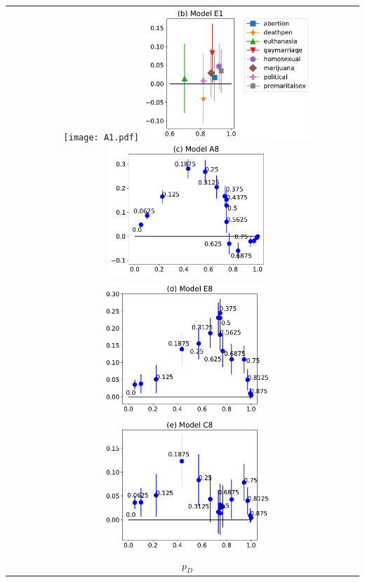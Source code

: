 \documentclass{standalone}
\begin{document}

\begin{tabular} {cc}
	\multirow{2}{*}[10pt]{\rotatebox{90}{$p_D-p_M$}}
		&
		\texttt{[image: A1.pdf]} \includegraphics[height=5cm]{E1.pdf}
		\includegraphics[height=5cm]{modelA8v2.pdf} \\
		 &
		\includegraphics[height=5cm]{modelE8v2.pdf}  \includegraphics[height=5cm]{modelC8v2.pdf} \\
		& $p_D$
\end{tabular}
\end{document}
